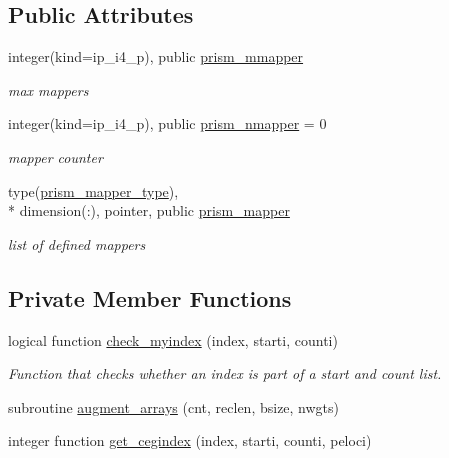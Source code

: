 \subsection*{Public Attributes}
\begin{DoxyCompactItemize}
\item 
integer(kind=ip\+\_\+i4\+\_\+p), public \hyperlink{classmod__oasis__map_ab15f72e9f33a67181edc977c06b951e2}{prism\+\_\+mmapper}
\begin{DoxyCompactList}\small\item\em max mappers \end{DoxyCompactList}\item 
integer(kind=ip\+\_\+i4\+\_\+p), public \hyperlink{classmod__oasis__map_af543b83ec5bed63a4448ff641137b0c5}{prism\+\_\+nmapper} = 0
\begin{DoxyCompactList}\small\item\em mapper counter \end{DoxyCompactList}\item 
type(\hyperlink{structmod__oasis__map_1_1prism__mapper__type}{prism\+\_\+mapper\+\_\+type}), \\*
dimension(\+:), pointer, public \hyperlink{classmod__oasis__map_a00ad53f61b6998938fca792455487f7e}{prism\+\_\+mapper}
\begin{DoxyCompactList}\small\item\em list of defined mappers \end{DoxyCompactList}\end{DoxyCompactItemize}
\subsection*{Private Member Functions}
\begin{DoxyCompactItemize}
\item 
logical function \hyperlink{classmod__oasis__map_a2528f60bde618dd4840d3adb5a569996}{check\+\_\+myindex} (index, starti, counti)
\begin{DoxyCompactList}\small\item\em Function that checks whether an index is part of a start and count list. \end{DoxyCompactList}\item 
subroutine \hyperlink{classmod__oasis__map_a84a573c180be2a5dc8a14fd18b2dc4b7}{augment\+\_\+arrays} (cnt, reclen, bsize, nwgts)
\item 
integer function \hyperlink{classmod__oasis__map_a8889e0dcab8e1e894d3203c480110bed}{get\+\_\+cegindex} (index, starti, counti, peloci)
\end{DoxyCompactItemize}
